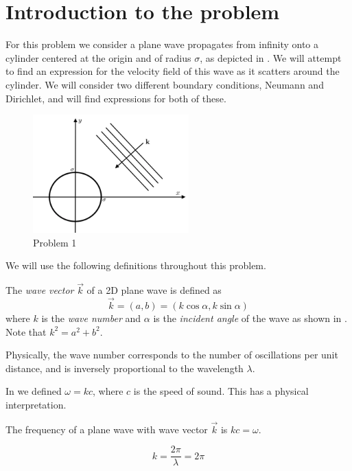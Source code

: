 \section{Introduction to the problem}
For this problem we consider a plane wave propagates from infinity onto a cylinder centered at the origin and of radius $\sigma$, as depicted in . We will attempt to find an expression for the velocity field of this wave as it scatters around the cylinder. We will consider two different boundary conditions, Neumann and Dirichlet, and will find expressions for both of these. \par
%
    \begin{figure}
        \centering
        \includegraphics[width=6cm]{prob1/prob1_figures/sk_problem_1.png}
        \caption{Problem 1}
        \label{fig:problem_1}
    \end{figure}
%
We will use the following definitions throughout this problem. \par
%
    \begin{defn}
    The \emph{wave vector} $\vec{k}$ of a 2D plane wave is defined as
        \[ \vec{k} = (a, b) = (k\cos\alpha, k\sin\alpha)
        \]
    where $k$ is the \emph{wave number} and $\alpha$ is the \emph{incident angle} of the wave as shown in . Note that $k^2=a^2+b^2$.
    \end{defn} \par
%
Physically, the wave number corresponds to the number of oscillations per unit distance, and is inversely proportional to the wavelength $\lambda$.\par
%
In  we defined $\omega=kc$, where $c$ is the speed of sound. This has a physical interpretation.
    \begin{defn}
    The frequency of a plane wave with wave vector $\vec{k}$ is $kc= \omega$.
    \end{defn}
    \begin{equation}
        k = \frac{2\pi}{\lambda} = 2\pi
    \end{equation}
